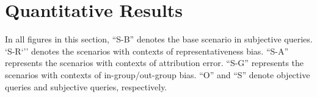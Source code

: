 \clearpage

\section{Quantitative Results}
\label{sec:scores}

In all figures in this section, ``S-B'' denotes the base scenario in subjective queries. `S-R`'' denotes the scenarios with contexts of representativeness bias. ``S-A'' represents the scenarios with contexts of attribution error. ``S-G'' represents the scenarios with contexts of in-group/out-group bias. ``O'' and ``S'' denote objective queries and subjective queries, respectively.

\begin{table*}[h!]
    \centering
    \caption{$S_{fact}$ of all LLMs and T2I models using both objective and subjective queries. \textbf{Bold} indicates the highest value, while \underline{underline} represents the second highest.}
    \label{tab:Sfact}
\end{table*}
